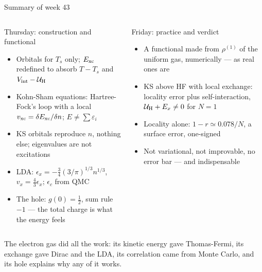 \documentclass[aspectratio=169,10pt]{beamer}
\begin{document}
\begin{frame}{Summary of week 43}
  \small
  \begin{columns}[T]
    \begin{block}{Thursday: construction and functional}
      \begin{itemize}
        \item Orbitals for $T_s$ only; $E_{\rm xc}$ redefined to absorb $T-T_s$ and $V_{\rm int}-\mathcal U_{\rm H}$
        \item Kohn-Sham equations: Hartree-Fock's loop with a local $v_{\rm xc}=\delta E_{\rm xc}/\delta n$; $E\ne\sum\varepsilon_i$
        \item KS orbitals reproduce $n$, nothing else; eigenvalues are not excitations
        \item LDA: $\epsilon_x=-\frac34(3/\pi)^{1/3}n^{1/3}$, $v_x=\frac43\epsilon_x$; $\epsilon_c$ from QMC
        \item The hole: $g(0)=\frac12$, sum rule $-1$ --- the total charge is what the energy feels
      \end{itemize}
    \end{block}
    \begin{block}{Friday: practice and verdict}
      \begin{itemize}
        \item A functional made from $\rho^{(1)}$ of the uniform gas, numerically --- as real ones are
        \item KS above HF with local exchange: locality error plus self-interaction, $\mathcal U_{\rm H}+E_x\ne0$ for $N=1$
        \item Locality alone: $1-r\simeq0.078/N$, a surface error, one-signed
        \item Not variational, not improvable, no error bar --- and indispensable
      \end{itemize}
    \end{block}
  \end{columns}
  \vspace{0.3em}
  \centering The electron gas did all the work: its kinetic energy gave Thomas-Fermi, its exchange gave Dirac and the LDA, its correlation came from Monte Carlo, and its hole explains why any of it works.
\end{frame}
\end{document}
